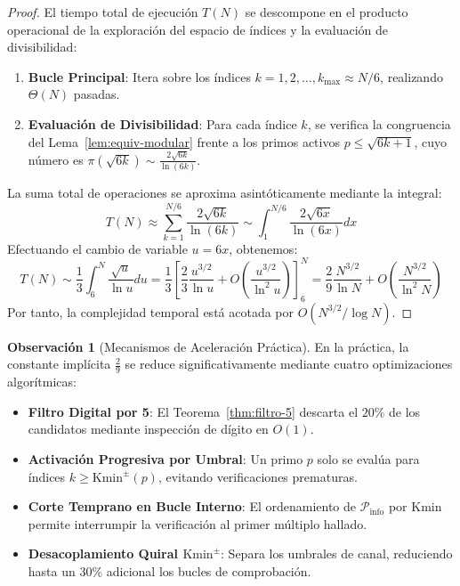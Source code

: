 \documentclass{article}
\numberwithin{equation}{section}
\theoremstyle{plain}
\theoremstyle{definition}
\newtheorem{remark}[theorem]{Observación}
\begin{document}
\begin{proof}
El tiempo total de ejecución $T(N)$ se descompone en el producto operacional de la exploración del espacio de índices y la evaluación de divisibilidad:
\begin{enumerate}
    \item \textbf{Bucle Principal}: Itera sobre los índices $k = 1, 2, \dots, k_{\max} \approx N/6$, realizando $\Theta(N)$ pasadas.
    \item \textbf{Evaluación de Divisibilidad}: Para cada índice $k$, se verifica la congruencia del Lema~\ref{lem:equiv-modular} frente a los primos activos $p \le \sqrt{6k+1}$, cuyo número es $\pi(\sqrt{6k}) \sim \frac{2\sqrt{6k}}{\ln(6k)}$.
\end{enumerate}
La suma total de operaciones se aproxima asintóticamente mediante la integral:
\begin{equation}
T(N) \approx \sum_{k=1}^{N/6} \frac{2\sqrt{6k}}{\ln(6k)} \sim \int_{1}^{N/6} \frac{2\sqrt{6x}}{\ln(6x)} dx
\end{equation}
Efectuando el cambio de variable $u = 6x$, obtenemos:
\begin{equation}
T(N) \sim \frac{1}{3} \int_{6}^{N} \frac{\sqrt{u}}{\ln u} du = \frac{1}{3} \left[ \frac{2}{3} \frac{u^{3/2}}{\ln u} + O\left(\frac{u^{3/2}}{\ln^2 u}\right) \right]_{6}^{N} = \frac{2}{9} \frac{N^{3/2}}{\ln N} + O\left(\frac{N^{3/2}}{\ln^2 N}\right)
\end{equation}
Por tanto, la complejidad temporal está acotada por $O(N^{3/2}/\log N)$.
\end{proof}

\begin{remark}[Mecanismos de Aceleración Práctica]
En la práctica, la constante implícita $\frac{2}{9}$ se reduce significativamente mediante cuatro optimizaciones algorítmicas:
\begin{itemize}
    \item \textbf{Filtro Digital por 5}: El Teorema~\ref{thm:filtro-5} descarta el $20\%$ de los candidatos mediante inspección de dígito en $O(1)$.
    \item \textbf{Activación Progresiva por Umbral}: Un primo $p$ solo se evalúa para índices $k \ge \mathrm{Kmin}^\pm(p)$, evitando verificaciones prematuras.
    \item \textbf{Corte Temprano en Bucle Interno}: El ordenamiento de $\mathcal{P}_{\text{info}}$ por $\mathrm{Kmin}$ permite interrumpir la verificación al primer múltiplo hallado.
    \item \textbf{Desacoplamiento Quiral $\mathrm{Kmin}^\pm$}: Separa los umbrales de canal, reduciendo hasta un $30\%$ adicional los bucles de comprobación.
\end{itemize}
\end{remark}
\end{document}
